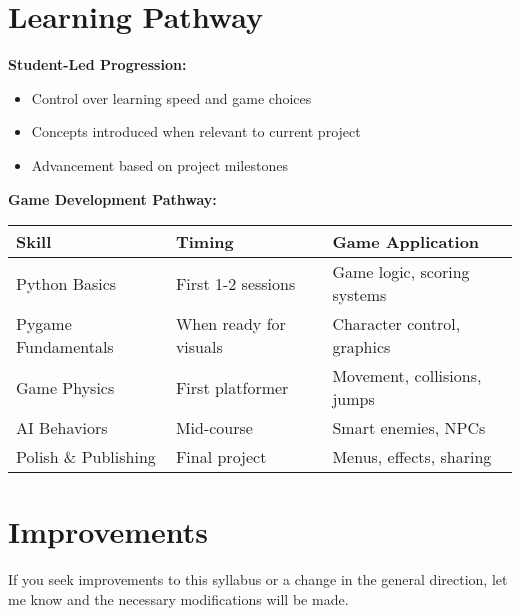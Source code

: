 \documentclass{article}
\begin{document}
\section{Learning Pathway}

\begin{learningblock}
\textbf{Student-Led Progression:}
\begin{itemize}[nosep]
    \item Control over learning speed and game choices
    \item Concepts introduced when relevant to current project
    \item Advancement based on project milestones
\end{itemize}

\textbf{Game Development Pathway:}
\begin{center}
\small
\begin{tabular}{p{3.5cm} p{3cm} p{6cm}}
\textbf{Skill} & \textbf{Timing} & \textbf{Game Application} \\
\hline
Python Basics & First 1-2 sessions & Game logic, scoring systems \\
\hline
Pygame Fundamentals & When ready for visuals & Character control, graphics \\
\hline
Game Physics & First platformer & Movement, collisions, jumps \\
\hline
AI Behaviors & Mid-course & Smart enemies, NPCs \\
\hline
Polish \& Publishing & Final project & Menus, effects, sharing \\
\end{tabular}
\end{center}
\end{learningblock}

\section{Improvements}
If you seek improvements to this syllabus or a change in the general direction, let me know and the necessary modifications will be made.
\end{document}
